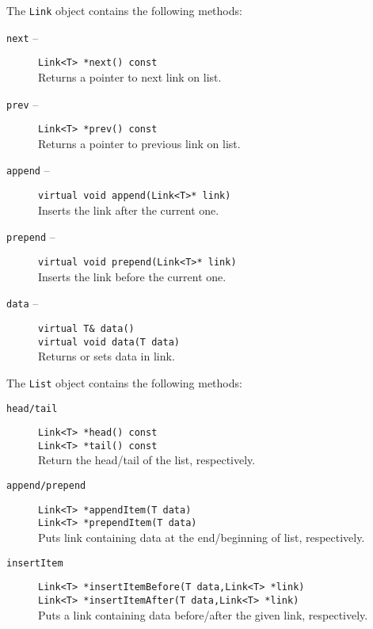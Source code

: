 The {\tt Link} object contains the following methods:
\begin{description}
\item[{\tt next} --]  
{\tt Link<T> *next() const}	\\
Returns a pointer to next link on list.
\item[{\tt prev} --]  
{\tt Link<T> *prev() const}	\\
Returns a pointer to previous link on list.
\item[{\tt append} --]  
{\tt virtual void append(Link<T>* link)} \\
Inserts the link after the 
current one.
\item[{\tt prepend} --]  
{\tt virtual void prepend(Link<T>* link)} \\
Inserts the link before the 
current one.
\item[{\tt data} --]  
{\tt virtual T\& data()} \\
{\tt virtual void data(T data)} \\
Returns or sets data in link.
\end{description}

The {\tt List} object contains the following methods:
\begin{description}
\item[\tt head/tail] 
{\tt  Link<T> *head() const} \\
{\tt  Link<T> *tail() const} \\
Return the head/tail of the list, respectively.
\item[\tt append/prepend] 
{\tt Link<T> *appendItem(T data)} \\
{\tt Link<T> *prependItem(T data)} \\
Puts link containing data at the end/beginning of list, respectively.
\item[{\tt insertItem}]
{\tt Link<T> *insertItemBefore(T data,Link<T> *link)} \\
{\tt Link<T> *insertItemAfter(T data,Link<T> *link)} \\
Puts a link containing data before/after the given link, respectively.
\end{description}

